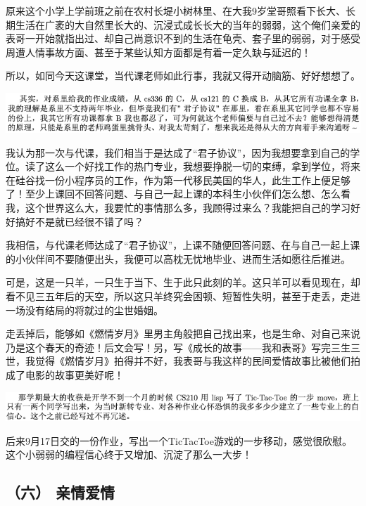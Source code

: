 \documentclass[9pt, b5paper]{article}
\begin{document}
原来这个小学上学前班之前在农村长堤小树林里、在大我9岁堂哥照看下长大、长期生活在广袤的大自然里长大的、沉浸式成长长大的当年的弱弱，这个俺们亲爱的表哥一开始就指出过、却自己尚意识不到的生活在龟壳、套子里的弱弱，对于感受周遭人情事故方面、甚至于某些认知方面都是有着一定久缺与延迟的！

所以，如同今天这课堂，当代课老师如此行事，我就又得开动脑筋、好好想想了。

\begin{center}
\includegraphics[width=.9\linewidth]{./pic/backups_plans_20210425_154431.png}
\end{center}

我认为那一次与代课，我们相当于是达成了“君子协议”，因为我想要拿到自己的学位。读了这么一个好找工作的热门专业，我想要挣脱一切的束缚，拿到学位，将来在硅谷找一份小程序员的工作，作为第一代移民美国的华人，此生工作上便足够了！至少上课回不回答问题、与自己一起上课的本科生小伙伴们怎么想、怎么看我，这个世界这么大，我要忙的事情那么多，我顾得过来么？我能把自己的学习好好搞好不是就已经很不错了吗？

我相信，与代课老师达成了“君子协议”，上课不随便回答问题、在与自己一起上课的小伙伴间不要随便出头，我便可以高枕无忧地毕业、进而生活如愿往后推进。

可是，这是一只羊，一只生于当下、生于此只此刻的羊。这只羊可以看见现在，却看不见三五年后的天空，所以这只羊终究会困顿、短暂性失明，甚至于走丢，走进一场没有结局的将就过的尘世婚姻。

走丢掉后，能够如《燃情岁月》里男主角般把自己找出来，也是生命、对自己来说乃是这个春天的奇迹！后文会写！另，写《成长的故事——我和表哥》写完三生三世，我觉得《燃情岁月》拍得并不好，我表哥与我这样的民间爱情故事比被他们拍成了电影的故事更美好呢！

\begin{center}
\includegraphics[width=.9\linewidth]{./pic/backups_plans_20210424_205732.png}
\end{center}

后来9月17日交的一份作业，写出一个TicTacToe游戏的一步移动，感觉很欣慰。这个小弱弱的编程信心终于又增加、沉淀了那么一大步！

\subsection{（六） 亲情爱情}
\label{sec:orgaefa911}
\end{document}

